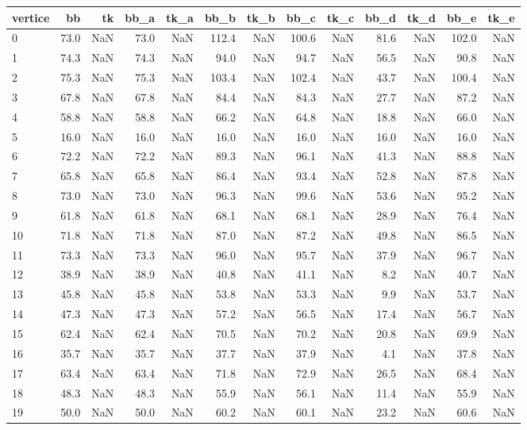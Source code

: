 \begin{tabular}{lrrrrrrrrrrrr}
\toprule
vertice & bb & tk & bb_a & tk_a & bb_b & tk_b & bb_c & tk_c & bb_d & tk_d & bb_e & tk_e \\
\midrule
0 & 73.0 & NaN & 73.0 & NaN & 112.4 & NaN & 100.6 & NaN & 81.6 & NaN & 102.0 & NaN \\
1 & 74.3 & NaN & 74.3 & NaN & 94.0 & NaN & 94.7 & NaN & 56.5 & NaN & 90.8 & NaN \\
2 & 75.3 & NaN & 75.3 & NaN & 103.4 & NaN & 102.4 & NaN & 43.7 & NaN & 100.4 & NaN \\
3 & 67.8 & NaN & 67.8 & NaN & 84.4 & NaN & 84.3 & NaN & 27.7 & NaN & 87.2 & NaN \\
4 & 58.8 & NaN & 58.8 & NaN & 66.2 & NaN & 64.8 & NaN & 18.8 & NaN & 66.0 & NaN \\
5 & 16.0 & NaN & 16.0 & NaN & 16.0 & NaN & 16.0 & NaN & 16.0 & NaN & 16.0 & NaN \\
6 & 72.2 & NaN & 72.2 & NaN & 89.3 & NaN & 96.1 & NaN & 41.3 & NaN & 88.8 & NaN \\
7 & 65.8 & NaN & 65.8 & NaN & 86.4 & NaN & 93.4 & NaN & 52.8 & NaN & 87.8 & NaN \\
8 & 73.0 & NaN & 73.0 & NaN & 96.3 & NaN & 99.6 & NaN & 53.6 & NaN & 95.2 & NaN \\
9 & 61.8 & NaN & 61.8 & NaN & 68.1 & NaN & 68.1 & NaN & 28.9 & NaN & 76.4 & NaN \\
10 & 71.8 & NaN & 71.8 & NaN & 87.0 & NaN & 87.2 & NaN & 49.8 & NaN & 86.5 & NaN \\
11 & 73.3 & NaN & 73.3 & NaN & 96.0 & NaN & 95.7 & NaN & 37.9 & NaN & 96.7 & NaN \\
12 & 38.9 & NaN & 38.9 & NaN & 40.8 & NaN & 41.1 & NaN & 8.2 & NaN & 40.7 & NaN \\
13 & 45.8 & NaN & 45.8 & NaN & 53.8 & NaN & 53.3 & NaN & 9.9 & NaN & 53.7 & NaN \\
14 & 47.3 & NaN & 47.3 & NaN & 57.2 & NaN & 56.5 & NaN & 17.4 & NaN & 56.7 & NaN \\
15 & 62.4 & NaN & 62.4 & NaN & 70.5 & NaN & 70.2 & NaN & 20.8 & NaN & 69.9 & NaN \\
16 & 35.7 & NaN & 35.7 & NaN & 37.7 & NaN & 37.9 & NaN & 4.1 & NaN & 37.8 & NaN \\
17 & 63.4 & NaN & 63.4 & NaN & 71.8 & NaN & 72.9 & NaN & 26.5 & NaN & 68.4 & NaN \\
18 & 48.3 & NaN & 48.3 & NaN & 55.9 & NaN & 56.1 & NaN & 11.4 & NaN & 55.9 & NaN \\
19 & 50.0 & NaN & 50.0 & NaN & 60.2 & NaN & 60.1 & NaN & 23.2 & NaN & 60.6 & NaN \\

\end{tabular}
